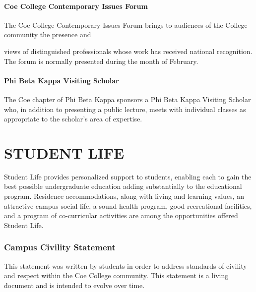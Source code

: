 \documentclass[
  letterpaper,
]{scrbook}
\begin{document}
\hypertarget{coe-college-contemporary-issues-forum}{%
\subsubsection{Coe College Contemporary Issues
Forum}\label{coe-college-contemporary-issues-forum}}

The Coe College Contemporary Issues Forum brings to audiences of the
College community the presence and

views of distinguished professionals whose work has received national
recognition. The forum is normally presented during the month of
February.

\hypertarget{phi-beta-kappa-visiting-scholar}{%
\subsubsection{Phi Beta Kappa Visiting
Scholar}\label{phi-beta-kappa-visiting-scholar}}

The Coe chapter of Phi Beta Kappa sponsors a Phi Beta Kappa Visiting
Scholar who, in addition to presenting a public lecture, meets with
individual classes as appropriate to the scholar's area of expertise.

\hypertarget{student-life}{%
\chapter{STUDENT LIFE}\label{student-life}}

Student Life provides personalized support to students, enabling each to
gain the best possible undergraduate education adding substantially to
the educational program. Residence accommodations, along with living and
learning values, an attractive campus social life, a sound health
program, good recreational facilities, and a program of co-curricular
activities are among the opportunities offered Student Life.

\hypertarget{campus-civility-statement}{%
\subsection{Campus Civility Statement}\label{campus-civility-statement}}

This statement was written by students in order to address standards of
civility and respect within the Coe College community. This statement is
a living document and is intended to evolve over time.
\end{document}
